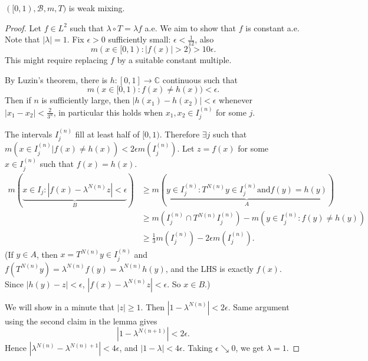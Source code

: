 \documentclass{article}
\begin{document}
\begin{thm}
  $([0,1), \mathcal{B}, m, T)$ is weak mixing. %
\end{thm}
\begin{proof}
  Let $f \in L^2$ such that $\lambda \circ T = \lambda f$ a.e.
  We aim to show that $f$ is constant a.e.
  Note that $|\lambda| = 1$.
  Fix $\epsilon > 0$ sufficiently small: $\epsilon< \frac{1}{12}$, also
  \begin{equation*}
    m(x \in [0,1 %
    ) : |f(x)| > 2) > 10 \epsilon.
  \end{equation*}
  This might require replacing $f$ by a suitable constant multiple.

  By Luzin's theorem, there is $h: [0,1] \to \mathbb{C}$ continuous such that
  \begin{equation*}
    m(x \in [0,1 %
    ): f(x) \neq h(x)) < \epsilon.
  \end{equation*}
  Then if $n$ is sufficiently large, then $|h(x_1) - h(x_2)| < \epsilon$ whenever $|x_1 - x_2| < \frac{2}{3^n}$, in particular this holds when $x_1, x_2 \in I_j^{(n)}$ for some $j$.

  The intervals $I_j^{(n)}$ fill at least half of $[0,1 %
  )$. Therefore $\exists j$ such that $m(x \in I_j^{(n)} | f(x) \neq h(x)) < 2 \epsilon m(I_j^{(n)})$.
  Let $z = f(x)$ for some $x \in I_j^{(n)}$ such that $f(x) = h(x)$.
  \begin{align*}
    m(\underbrace{x \in I_j : |f(x) - \lambda^{N(n)} z| < \epsilon}_B) &\geq m(\underbrace{y \in I_j^{(n)} : T^{N(n)} y \in I_j^{(n)} \text{and} f(y) = h(y)}_A) \\
                                                                       &\geq m(I_j^{(n)} \cap T^{N(n)} I_j^{(n)}) - m(y \in I_j^{(n)} : f(y) \neq h(y)) \\
                                                                       &\geq \frac{1}{3} m(I_j^{(n)}) - 2\epsilon m(I_j^{(n)}).
  \end{align*}
  (If $y \in A$, then $x = T^{N(n)} y \in I_j^{(n)}$ and $f(T^{N(n)} y) = \lambda^{N(n)} f(y) = \lambda^{N(n)} h(y)$, and the LHS is exactly $f(x)$.
  Since $|h(y) - z| < \epsilon$, $|f(x) - \lambda^{N(n)} z| < \epsilon$. So $x \in B$.)

  We will show in a minute that $|z| \geq 1$.
  Then $|1 - \lambda^{N(n)}| < 2\epsilon $.
  Same argument using the second claim in the lemma gives
  \begin{equation*}
    |1 - \lambda^{N(n+1)}| < 2\epsilon.
  \end{equation*}
  Hence $|\lambda^{N(n)} - \lambda^{N(n)+1}| < 4\epsilon$, and $|1 - \lambda| < 4\epsilon$. Taking $\epsilon \searrow 0$, we get $\lambda = 1$.


\end{proof}
\end{document}
